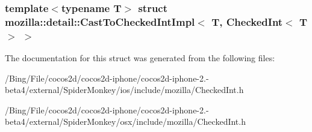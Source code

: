 \subsubsection*{template$<$typename T$>$ struct mozilla\-::detail\-::\-Cast\-To\-Checked\-Int\-Impl$<$ T, Checked\-Int$<$ T $>$ $>$}



The documentation for this struct was generated from the following files\-:\begin{DoxyCompactItemize}
\item 
/\-Bing/\-File/cocos2d/cocos2d-\/iphone/cocos2d-\/iphone-\/2.-\/beta4/external/\-Spider\-Monkey/ios/include/mozilla/Checked\-Int.\-h\item 
/\-Bing/\-File/cocos2d/cocos2d-\/iphone/cocos2d-\/iphone-\/2.-\/beta4/external/\-Spider\-Monkey/osx/include/mozilla/Checked\-Int.\-h\end{DoxyCompactItemize}
